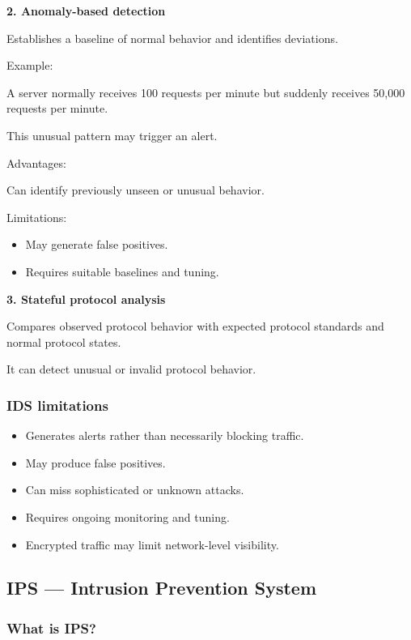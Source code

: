 \textbf{2. Anomaly-based detection}

Establishes a baseline of normal behavior and identifies deviations.

Example:

A server normally receives 100 requests per minute but suddenly receives 50,000 requests per minute.

This unusual pattern may trigger an alert.

Advantages:

\- Can identify previously unseen or unusual behavior.

Limitations:

\begin{itemize}
\item May generate false positives.
\item Requires suitable baselines and tuning.
\end{itemize}

\textbf{3. Stateful protocol analysis}

Compares observed protocol behavior with expected protocol standards and normal protocol states.

It can detect unusual or invalid protocol behavior.

\subsubsection{IDS limitations}

\begin{itemize}
\item Generates alerts rather than necessarily blocking traffic.
\item May produce false positives.
\item Can miss sophisticated or unknown attacks.
\item Requires ongoing monitoring and tuning.
\item Encrypted traffic may limit network-level visibility.
\end{itemize}

\subsection{IPS --- Intrusion Prevention System}

\subsubsection{What is IPS?}

